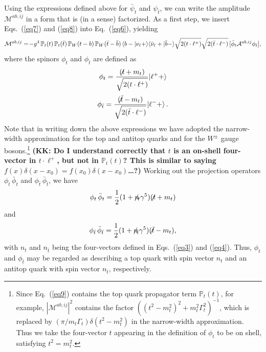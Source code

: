 \documentclass[aps,preprint,tightenlines,floatfix,superscriptaddress,nofootinbib,showpacs]{revtex4-1}
\def\beq{\begin{equation}}
\def\eeq{\end{equation}}
\def\tbslash{\tbar\hspace{-10pt}\not{}\hspace{4pt}}
\def\tslash{t\hspace{-10pt}\not{}\hspace{4pt}}
\def\nslash{n\hspace{-10pt}\not{}\hspace{4pt}}
\def\tbar{\bar{t}}
\def\bbar{\bar{b}}
\def\nubar{{\bar{\nu}}_{\ell}}
\begin{document}
Using the expressions defined above for $\bar{\psi}_t$ and
$\psi_{\tbar}$, we can write the amplitude $\mathcal{M}^{ab,ij}$
in a form that is (in a sense) factorized.
As a first step, we insert
Eqs.~(\ref{eq7}) and (\ref{eq8}) into Eq.~(\ref{eq6}), yielding
%
\beq
\label{eq9}
\mathcal{M}^{ab,ij}=\!-g^4\,\mathbb{P}_t(t)\,\mathbb{P}_t(\tbar)\,\mathbb{P}_W(t-b)\,\mathbb{P}_W(\tbar-\bbar)\,\langle b-|\nu_{\ell}+\rangle \langle\nubar+|\bbar-\rangle \sqrt{\strut2(t\cdot {\ell}^+)}\sqrt{\strut2(\tbar\cdot {\ell}^-)}\,[\bar{\phi}_t \mathcal{A}^{ab,ij}\phi_{\tbar}],
\eeq
%
where the spinors $\phi_{t}$ and $\phi_{\tbar}$ are defined as
%
\beq
\label{eq10}
\phi_t=\frac{(\tslash +m_t)}{\sqrt{\strut2(t\cdot {\ell}^+)}}|{\ell}^++\rangle
\eeq
%
\beq
\label{eq11}
\phi_{\tbar}=\frac{(\tbslash -m_t)}{\sqrt{\strut2(\tbar\cdot {\ell}^-)}}|{\ell}^-+\rangle \,.
\eeq
%
Note that in writing down the above expressions we have adopted the narrow-width
approximation for the top and antitop quarks and for the $W^\pm$ gauge
bosons.\footnote{Since Eq.~(\ref{eq9}) contains the top quark propagator
  term
  $\mathbb{P}_t(t)$, for example, $|\mathcal{M}^{ab,ij}|^2$ contains
  the factor $((t^2-m^2_t)^2+m^2_t\Gamma^2_t)^{-1}$,
  which is replaced by $(\pi/m_t\Gamma_t)\delta(t^2-m^2_t)$
  in the narrow-width approximation.  Thus we take the four-vector
  $t$ appearing in the definition of $\phi_t$ to be
  on shell, satisfying $t^2 = m_t^2$.} {\bf (KK: Do I understand correctly
  that $t$ is an on-shell four-vector in $t\cdot \ell^+$, but not
  in $\mathbb{P}_t(t)$?  This is similar to saying $f(x)\delta(x-x_0) =
  f(x_0)\delta(x-x_0)$\ldots?)}
Working out the projection operators $\phi_t\,\bar{\phi}_t$
and $\phi_{\tbar}\,\bar{\phi}_{\tbar}$, we have
%
\beq
\label{eq12}
\phi_t\,\bar{\phi}_t=\frac{1}{2}(1+\nslash_{\!t}\gamma^5)(\tslash +m_t)
\eeq
%
and
%
\beq
\label{eq13}
\phi_{\tbar}\,\bar{\phi}_{\tbar}=\frac{1}{2}(1+\nslash_{\!\tbar}\gamma^5)(\tbslash -m_t),
\eeq
%
with $n_t$ and $n_{\tbar}$ being the four-vectors defined in
Eqs.~(\ref{eq3}) and (\ref{eq4}).  Thus, $\phi_t$ and $\phi_{\tbar}$
may be regarded as
describing a top quark with spin vector $n_t$ and an antitop quark
with spin vector $n_{\tbar}$, respectively.
\end{document}
